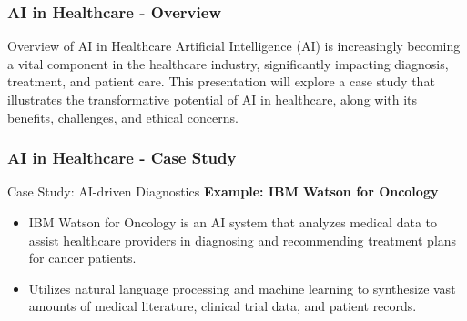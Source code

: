 \documentclass[aspectratio=169]{beamer}
\begin{document}
\begin{frame}[fragile]
    \frametitle{AI in Healthcare - Overview}
    \begin{block}{Overview of AI in Healthcare}
        Artificial Intelligence (AI) is increasingly becoming a vital component in the healthcare industry, significantly impacting diagnosis, treatment, and patient care. 
        This presentation will explore a case study that illustrates the transformative potential of AI in healthcare, along with its benefits, challenges, and ethical concerns.
    \end{block}
\end{frame}

\begin{frame}[fragile]
    \frametitle{AI in Healthcare - Case Study}
    \begin{block}{Case Study: AI-driven Diagnostics}
        \textbf{Example: IBM Watson for Oncology}
        \begin{itemize}
            \item IBM Watson for Oncology is an AI system that analyzes medical data to assist healthcare providers in diagnosing and recommending treatment plans for cancer patients.
            \item Utilizes natural language processing and machine learning to synthesize vast amounts of medical literature, clinical trial data, and patient records.
        \end{itemize}
    \end{block}
\end{frame}
\end{document}
